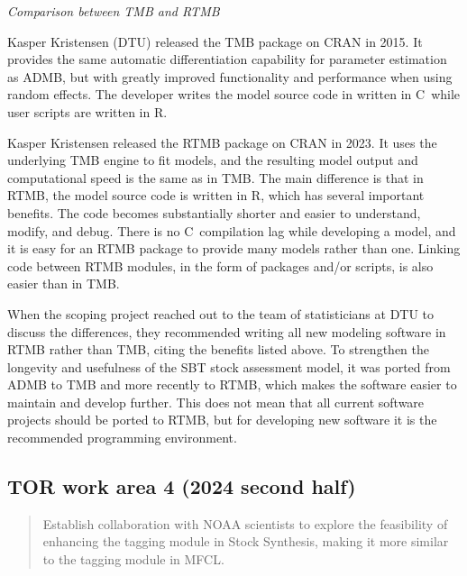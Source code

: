 \documentclass{SCreport}
\newcommand\cpp{\mbox{C\raisebox{0.5ex}{\tiny\bfseries ++}}}
\begin{document}
\vspace{2ex}

\textit{Comparison between TMB and RTMB}

Kasper Kristensen (DTU) released the TMB package on CRAN in 2015. It provides
the same automatic differentiation capability for parameter estimation as ADMB,
but with greatly improved functionality and performance when using random
effects. The developer writes the model source code in written in \cpp\, while
user scripts are written in R.

Kasper Kristensen released the RTMB package on CRAN in 2023. It uses the
underlying TMB engine to fit models, and the resulting model output and
computational speed is the same as in TMB. The main difference is that in RTMB,
the model source code is written in R, which has several important benefits. The
code becomes substantially shorter and easier to understand, modify, and debug.
There is no \cpp\ compilation lag while developing a model, and it is easy for
an RTMB package to provide many models rather than one. Linking code between
RTMB modules, in the form of packages and/or scripts, is also easier than in
TMB.

When the scoping project reached out to the team of statisticians at DTU to
discuss the differences, they recommended writing all new modeling software in
RTMB rather than TMB, citing the benefits listed above. To strengthen the
longevity and usefulness of the SBT stock assessment model, it was ported from
ADMB to TMB and more recently to RTMB, which makes the software easier to
maintain and develop further. This does not mean that all current software
projects should be ported to RTMB, but for developing new software it is the
recommended programming environment.

\vspace{2ex}

\subsection{TOR work area 4 (2024 second half)}

\begin{quote}\sf
  Establish collaboration with NOAA scientists to explore the feasibility of
  enhancing the tagging module in Stock Synthesis, making it more similar to the
  tagging module in MFCL.
\end{quote}

\vspace{2ex}
\end{document}
